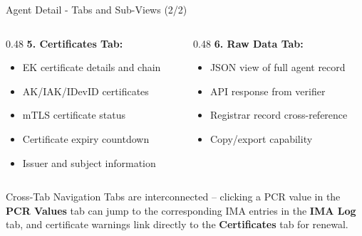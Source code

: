 \begin{frame}{Agent Detail - Tabs and Sub-Views (2/2)}
  \scriptsize
  \begin{columns}[T]
    \begin{column}{0.48\textwidth}
      \textbf{5. Certificates Tab:}
      \begin{itemize}
        \item EK certificate details and chain
        \item AK/IAK/IDevID certificates
        \item mTLS certificate status
        \item Certificate expiry countdown
        \item Issuer and subject information
      \end{itemize}
    \end{column}
    \begin{column}{0.48\textwidth}
      \textbf{6. Raw Data Tab:}
      \begin{itemize}
        \item JSON view of full agent record
        \item API response from verifier
        \item Registrar record cross-reference
        \item Copy/export capability
      \end{itemize}
    \end{column}
  \end{columns}

  \vspace{0.3cm}

  \begin{alertblock}{Cross-Tab Navigation}
    \scriptsize
    Tabs are interconnected -- clicking a PCR value in the \textbf{PCR Values} tab
    can jump to the corresponding IMA entries in the \textbf{IMA Log} tab, and
    certificate warnings link directly to the \textbf{Certificates} tab for renewal.
  \end{alertblock}
\end{frame}

